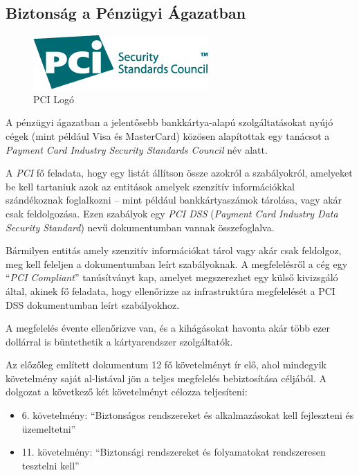\documentclass[a4paper,12pt]{article}
\begin{document}
\subsection{Biztonság a Pénzügyi Ágazatban}

	\begin{figure}
		\vspace{-10pt}
		\centering
		\includegraphics[scale=0.5]{pci.png}
		\caption{PCI Logó}
	\end{figure}
	
	A pénzügyi ágazatban a jelentősebb bankkártya-alapú szolgáltatásokat nyújó cégek (mint például Visa és MasterCard) közösen alapítottak egy tanácsot a \textit{Payment Card Industry Security Standards Council} név alatt.
	
	A \textit{PCI} fő feladata, hogy egy listát állítson össze azokról a szabályokról, amelyeket be kell tartaniuk azok az entitások amelyek szenzitív információkkal szándékoznak foglalkozni -- mint például bankkártyaszámok tárolása, vagy akár csak feldolgozása. Ezen szabályok egy \textit{PCI DSS} (\textit{Payment Card Industry Data Security Standard}) nevű dokumentumban vannak összefoglalva.
	
	Bármilyen entitás amely szenzitív információkat tárol vagy akár csak feldolgoz, meg kell feleljen a dokumentumban leírt szabályoknak. A megfelelésről a cég egy ``\textit{PCI Compliant}'' tanúsítványt kap, amelyet megszerezhet egy külső kivizsgáló által, akinek fő feladata, hogy ellenőrizze az infrastruktúra megfelelését a PCI DSS dokumentumban leírt szabályokhoz.
	
	A megfelelés évente ellenőrizve van, és a kihágásokat havonta akár több ezer dollárral is büntethetik a kártyarendszer szolgáltatók\cite{wfargo15}.
	
	Az előzőleg említett dokumentum 12 fő követelményt\cite{pcidss31} ír elő, ahol mindegyik követelmény saját al-listával jön a teljes megfelelés bebiztosítása céljából. A dolgozat a következő két követelményt célozza teljesíteni:
	
	\begin{itemize}
		\item 6. követelmény: ``Biztonságos rendszereket és alkalmazásokat kell fejleszteni és üzemeltetni''
		\item 11. követelmény: ``Biztonsági rendszereket és folyamatokat rendszeresen tesztelni kell''
	\end{itemize}
	
\end{document}
